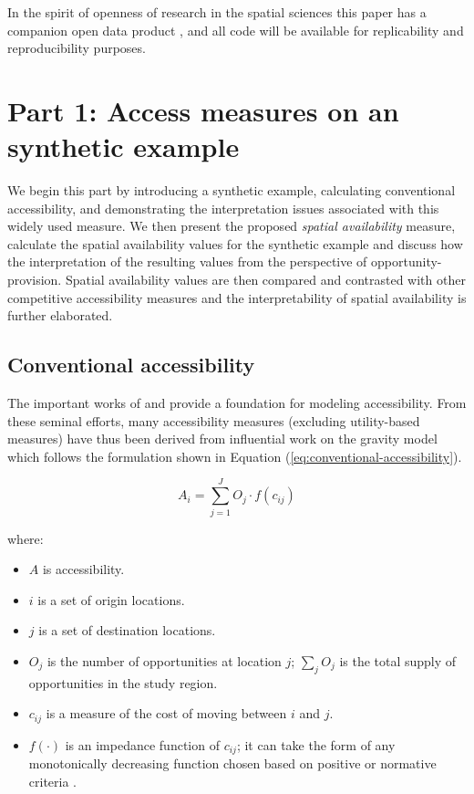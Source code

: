 \documentclass[]{elsarticle} %
\providecommand{\tightlist}{%
  \setlength{\itemsep}{0pt}\setlength{\parskip}{0pt}}
\begin{document}
In the spirit of openness of research in the spatial sciences
\citep{brunsdon2021opening, paez2021open} this paper has a companion
open data product \citep{arribas2021Open}, and all code will be
available for replicability and reproducibility purposes.

\hypertarget{background}{%
\section{Part 1: Access measures on an synthetic
example}\label{background}}

We begin this part by introducing a synthetic example, calculating
conventional accessibility, and demonstrating the interpretation issues
associated with this widely used measure. We then present the proposed
\emph{spatial availability} measure, calculate the spatial availability
values for the synthetic example and discuss how the interpretation of
the resulting values from the perspective of opportunity-provision.
Spatial availability values are then compared and contrasted with other
competitive accessibility measures
\citep{shen1998, luo2003, horner_exploring_2004, allen2019} and the
interpretability of spatial availability is further elaborated.

\hypertarget{conventional-accessibility}{%
\subsection{Conventional
accessibility}\label{conventional-accessibility}}

The important works of \citeyearpar{harris_market_1954} and
\citeyearpar{hansen1959} provide a foundation for modeling
accessibility. From these seminal efforts, many accessibility measures
(excluding utility-based measures) have thus been derived from
\citeyearpar{wilson1971} influential work on the gravity model which
follows the formulation shown in Equation
(\ref{eq:conventional-accessibility}).

\begin{equation}
\label{eq:conventional-accessibility}
A_i = \sum_{j=1}^JO_j \cdot f(c_{ij})
\end{equation}

\noindent where:

\begin{itemize}
\tightlist
\item
  \(A\) is accessibility.
\item
  \(i\) is a set of origin locations.
\item
  \(j\) is a set of destination locations.
\item
  \(O_j\) is the number of opportunities at location \(j\);
  \(\sum_j O_j\) is the total supply of opportunities in the study
  region.
\item
  \(c_{ij}\) is a measure of the cost of moving between \(i\) and \(j\).
\item
  \(f(\cdot)\) is an impedance function of \(c_{ij}\); it can take the
  form of any monotonically decreasing function chosen based on positive
  or normative criteria \citep{paez2012measuring}.
\end{itemize}
\end{document}
